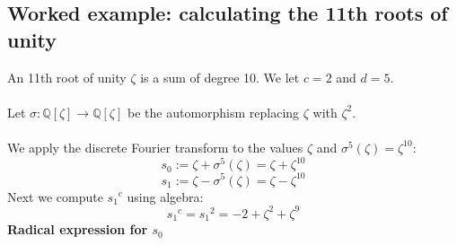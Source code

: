 \documentclass{article}
\begin{document}
    \subsection{Worked example: calculating the 11th roots of unity}
        An 11th root of unity $ \zeta $ is a sum of degree 10. We let $ c = 2 $ and $ d = 5 $.\\
        \\
        Let $ \sigma: \mathbb{Q}[\zeta] \rightarrow \mathbb{Q}[\zeta] $ be the automorphism replacing $ \zeta $ with $ \zeta^2 $.\\
        \\
        We apply the discrete Fourier transform to the values $ \zeta $ and $ \sigma^5(\zeta) = \zeta^{10} $:
        $$ s_0 := \zeta + \sigma^5(\zeta) = \zeta + \zeta^{10} $$
        $$ s_1 := \zeta - \sigma^5(\zeta) = \zeta - \zeta^{10} $$
        Next we compute $ {s_1}^c $ using algebra:
        $$ {s_1}^c = {s_1}^2 = -2 + \zeta^2 + \zeta^9 $$
        \textbf{Radical expression for $ s_0 $}\\
\end{document}
